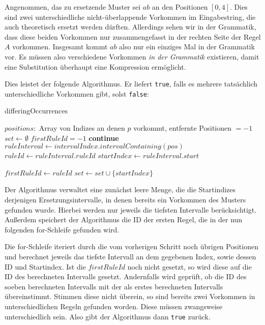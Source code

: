 Angenommen, das zu ersetzende Muster sei $ab$ an den Positionen $[0, 4]$. Dies sind zwei unterschiedliche nicht-überlappende Vorkommen im Eingabestring, die auch theoretisch ersetzt werden dürften. Allerdings sehen wir in der Grammatik, dass diese beiden Vorkommen nur zusammengefasst in der rechten Seite der Regel $A$ vorkommen. Insgesamt kommt $ab$ also nur ein einziges Mal in der Grammatik vor. Es müssen also verschiedene Vorkommen \textit{in der Grammatik} existieren, damit eine Substitution überhaupt eine Kompression ermöglicht.

Dies leistet der folgende Algorithmus. Er liefert \texttt{true}, falls es mehrere tatsächlich unterschiedliche Vorkommen gibt, solst \texttt{false}:

\begin{algorithm}
    \begin{algorithmic}
        \caption{differingOccurrences}
        \REQUIRE $positions: $ Array von Indizes an denen $p$ vorkommt, entfernte Positionen $=-1$
        \STATE $set \leftarrow \emptyset$
        \STATE $firstRuleId = -1$
                \STATE \textbf{continue}
            \ENDIF
            \STATE $ruleInterval \leftarrow intervalIndex.intervalContaining(pos)$
            \STATE $ruleId \leftarrow ruleInterval.ruleId$
            \STATE $startIndex \leftarrow ruleInterval.start$

                \STATE $firstRuleId \leftarrow ruleId$
                \RETURN \TRUE
            \ENDIF
            \STATE $set \leftarrow set \cup \{startIndex\}$
        \ENDFOR
        \RETURN \FALSE
    \end{algorithmic}
\end{algorithm}

Der Algorithmus verwaltet eine zunächst leere Menge, die die Startindizes derjenigen Ersetzungsintervalle, in denen bereits ein Vorkommen des Musters gefunden wurde. Hierbei werden nur jeweils die tiefsten Intervalle berücksichtigt. Außerdem speichert der Algorithmus die ID der ersten Regel, die in der nun folgenden for-Schleife gefunden wird.

Die for-Schleife iteriert durch die vom vorherigen Schritt noch übrigen Positionen und berechnet jeweils das tiefste Intervall an dem gegebenen Index, sowie dessen ID und Startindex. Ist die $firstRuleId$ noch nicht gesetzt, so wird diese auf die ID des berechneten Intervalls gesetzt. Andernfalls wird geprüft, ob die ID des soeben berechneten Intervalls mit der als erstes berechneten Intervalls übereinstimmt. Stimmen diese nicht überein, so sind bereits zwei Vorkommen in unterschiedlichen Regeln gefunden worden. Diese müssen zwangsweise unterschiedlich sein. Also gibt der Algorithmus dann \texttt{true} zurück.

